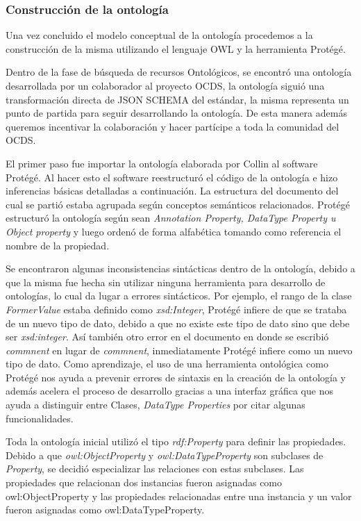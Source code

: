 \subsubsection{Construcción de la ontología}

Una vez concluido el modelo conceptual de la ontología procedemos a la construcción de la misma utilizando el lenguaje OWL y la herramienta Protégé.

Dentro de la fase de búsqueda de recursos Ontológicos, se encontró una ontología desarrollada por un colaborador al proyecto OCDS, la ontología siguió una transformación directa de JSON SCHEMA del estándar, la misma representa un punto de partida para seguir desarrollando la ontología. De esta manera además queremos incentivar la colaboración y hacer partícipe a toda la comunidad del OCDS.

El primer paso fue importar la ontología elaborada por Collin al software Protégé. Al hacer esto el software reestructuró el código de la ontología e hizo inferencias básicas detalladas a continuación. La estructura del documento del cual se partió estaba agrupada según conceptos semánticos relacionados. Protégé estructuró la ontología según sean \textit{Annotation Property, DataType Property u Object property} y luego ordenó de forma alfabética tomando como referencia el nombre de la propiedad.

Se encontraron algunas inconsistencias sintácticas dentro de la ontología, debido a que la misma fue hecha sin utilizar ninguna herramienta para desarrollo de ontologías, lo cual da lugar a errores sintácticos. Por ejemplo, el rango de la clase \textit{FormerValue} estaba definido como \textit{xsd:Integer}, Protégé infiere de que se trataba de un nuevo tipo de dato,  debido a que no existe este tipo de dato sino que debe ser \textit{xsd:integer}. Así también otro error en el documento en donde se escribió \textit{commnent} en lugar de \textit{commnent}, inmediatamente Protégé infiere como un nuevo tipo de dato. Como aprendizaje, el uso de una herramienta ontológica como Protégé nos ayuda a prevenir errores de sintaxis en la creación de la ontología y además acelera el proceso de desarrollo gracias a una interfaz gráfica que nos ayuda a distinguir entre Clases, \textit{DataType Properties} por citar algunas funcionalidades.

Toda la ontología inicial utilizó el tipo \textit{rdf:Property} para definir las propiedades. Debido a que \textit{owl:ObjectProperty} y \textit{owl:DataTypeProperty} son subclases de \textit{Property}, se decidió especializar las relaciones con estas subclases. Las propiedades que relacionan dos instancias fueron asignadas como owl:ObjectProperty y las propiedades relacionadas entre una instancia y un valor fueron asignadas como owl:DataTypeProperty.

